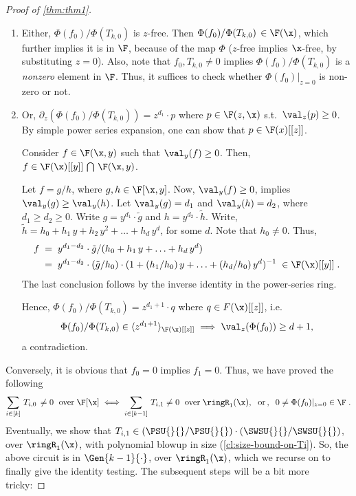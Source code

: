 \begin{proof}[Proof of \autoref{thm:thm1}]
\begin{enumerate}
    \setlength\itemsep{1em}
    \item Either, $\Phi(f_0)/\Phi(T_{k,0})$ is $z$-free. Then $\Phi(f_0)/\Phi(T_{k,0}) \,\in \F(\x)$, which further implies it is in $\F$, because of the map $\Phi$ ($z$-free implies $\x$-free, by substituting $z=0$). Also, note that $f_0, T_{k,0} \ne 0$ implies $\Phi(f_0)/\Phi(T_{k,0})$ is a \emph{nonzero} element in $\F$. Thus, it suffices to check whether  $\Phi(f_0)\rvert_{z=0}$ is non-zero or not. 
%
    \item Or, $\partial_{z}(\Phi(f_0)/\Phi(T_{k,0}))= z^{d_1} \cdot p$ where $p \in \F(z,\x)$ s.t.~$\val_{z}(p) \ge 0$. By simple power series expansion, one can show that $p \in \F(x)[[z]]$. 
    
    \begin{lemma}[Valuation]\label{lem:val-powerseries}
        Consider $f \in \F(\x,y)$ such that $\val_{y}(f) \ge 0$. Then, $f \in \F(\x)[[y]]\,\bigcap\,\F(\x,y)$.
    \end{lemma}
    \begin{proof-sketch}
        Let $f=g/h$, where $g,h \in \F[\x,y]$. Now, $\val_{y}(f) \ge 0$, implies $\val_y(g) \ge \val_y(h)$. Let $\val_{y}(g)=d_1$ and $\val_{y}(h)=d_2$, where $d_1 \ge d_2 \ge 0$. Write $g=y^{d_1}\cdot \tilde{g}$ and $h=y^{d_2}\cdot \tilde{h}$. Write, $\tilde{h}= h_0+h_1\,y+h_2\,y^2+\hdots + h_d\,y^d$, for some $d$. Note that $h_0 \ne 0$. Thus, 
        \begin{align*}
            f&\;=\; y^{d_1-d_2} \cdot \tilde{g}/(h_0+h_1\,y+\hdots+h_d\,y^d) \\ &\;=\;y^{d_1-d_2} \cdot (\tilde{g}/h_0) \cdot (1+(h_1/h_0)\,y+\hdots + (h_d/h_0)\,y^d)^{-1}\; \in \F(\x)[[y]]\;.
        \end{align*}
        The last conclusion follows by the inverse identity in the power-series ring.
    \end{proof-sketch}

    Hence, $\Phi(f_0)/\Phi(T_{k,0}) = z^{d_1+1} \cdot q$ where $q \in F(\x)[[z]]$, i.e. \[\Phi(f_0)/\Phi(T_{k,0}) \in \langle z^{d_1+1}\rangle_{\F(\x)[[z]]} \implies \val_{z}(\Phi(f_0)) \ge d+1,\] a contradiction.
\end{enumerate}

\noindent Conversely, it is obvious that $f_0=0$ implies $f_1=0$. Thus, we have proved the following 
\[ \sum_{i \in [k]}\,T_{i,0}\,\ne 0 \;\text{ over}\;\F[\x] \iff \sum_{i \in [k-1]}\, T_{i,1} \ne 0 \;\text{ over} \;\ringR_1(\x),\;\text{ or}\,,\;\;0 \ne \Phi(f_0) \rvert_{z=0} \in \F\;.\]
 Eventually, we show that $T_{i,1} \in (\PSU{}{}/\PSU{}{}) \cdot (\SWSU{}{}/\SWSU{}{})$, over $\ringR_1(\x)$, with polynomial blowup in size (\autoref{cl:size-bound-on-Ti}). So, the above circuit is in $\Gen{k-1}{\cdot}$, over $\ringR_1(\x)$, which we recurse on to finally give the identity testing. The subsequent steps will be a bit more tricky:


\end{proof}
